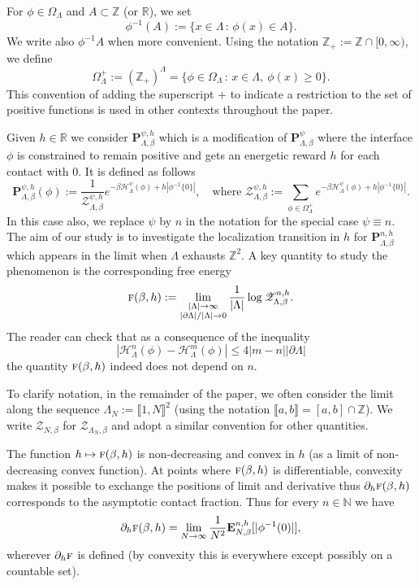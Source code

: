 \documentclass[JEP,XML,SOM,Unicode, NoFloatCountersInSection]{cedram}
\let\mathcal\mathscr
\newcommand{\sep}{\,:\,}
\numberwithin{equation}{section}
\theoremstyle{plain}
\theoremstyle{definition}
\newcommand{\lint}{\llbracket}
\newcommand{\rint}{\rrbracket}
\newcommand{\cH}{{\ensuremath{\mathcal H}} }
\newcommand{\cZ}{{\ensuremath{\mathcal Z}} }
\newcommand{\bP}{{\ensuremath{\mathbf P}} }
\newcommand{\bE}{{\ensuremath{\mathbf E}} }
\newcommand{\limtwo}[2]{\lim_{\substack{#1 \\ #2}}}
\newcommand{\bbN}{{\ensuremath{\mathbb N}} }
\newcommand{\bbR}{{\ensuremath{\mathbb R}} }
\newcommand{\bbZ}{{\ensuremath{\mathbb Z}} }
\newcommand{\gb}{\beta}
\newcommand{\gO}{\Omega}
\newcommand{\gL}{\Lambda}
\newcommand{\tf}{\textsc{f}}
\begin{document}
For $\phi \in \gO_{\gL}$ and $A\subset \bbZ$ (or $\bbR$), we set
\[
\phi^{-1}(A):=\{ x\in \gL \sep \phi(x)\in A\}.
\]
We write also $\phi^{-1}A$ when more convenient.
Using the notation $\bbZ_+:=\bbZ\cap[0,\infty)$, we define
\begin{equation}\label{positivity}
\gO^+_{\gL}:=(\bbZ_+)^{\gL}=\{\phi \in \gO_{\gL} \sep x\in \gL,\ \phi(x)\ge 0\}.
\end{equation}
This convention of adding the superscript $+$ to indicate a restriction to the set of positive functions
is used in other contexts throughout the paper.

Given $h\in \bbR$ we consider $\bP^{\psi,h}_{\gL,\gb}$ which is a modification of $\bP^{\psi}_{\gL,\gb}$
where the interface $\phi$ is constrained to remain positive
and gets an energetic reward $h$ for each contact with $0$.
It is defined as follows
\begin{equation*}%
\bP^{\psi,h}_{\gL,\gb}(\phi):= \frac{1}{\mathcal Z^{\psi,h}_{\gL,\gb}}e^{-\gb\cH^\psi_\gL(\phi)+ h|\phi^{-1}\{0\}|},
\quad \text{where } \mathcal Z^{\psi,h}_{\gL,\gb}:=\sum_{\phi\in \gO^+_{\gL}} e^{-\gb\cH^\psi_\gL(\phi)+h|\phi^{-1}\{0\}|}.
\end{equation*}
In this case also, we replace $\psi$ by $n$ in the notation for the special case $\psi\equiv n$.
The aim of our study is to investigate the localization transition in $h$ for $\bP^{n,h}_{\gL,\gb}$ which appears in the limit when $\gL$ exhausts $\bbZ^2$.
A key quantity to study the phenomenon is the corresponding free energy
\begin{equation*}%
\tf(\gb,h):=\limtwo{|\gL|\to \infty}{|\partial \gL|/|\gL|\to 0} \frac{1}{|\gL|}\log \mathcal Z^{n,h}_{\gL,\gb}.
\end{equation*}
The reader can check that as a consequence of the inequality
\[
|\cH^n_\gL(\phi)- \cH^m_\gL(\phi)|\le 4 |m-n| |\partial \gL|
\]
the quantity
$\tf(\gb,h)$ indeed does not depend on $n$.

To clarify notation, in the remainder of the paper, we often consider the limit along the sequence
$\gL_N:=\lint 1, N\rint^2$ (using the notation $\lint a,b \rint=[a,b]\cap \bbZ$).
We write $\cZ_{N,\gb}$ for $\cZ_{\gL_N,\gb}$ and adopt a similar convention for other quantities.

The function $h\mapsto \tf(\gb,h)$ is non-decreasing and convex in $h$ (as a limit of non-decreasing convex function).
At points where $\tf(\gb,h)$ is differentiable, convexity makes it possible to exchange the positions of limit and derivative
thus $\partial_h \tf(\gb,h)$ corresponds to the
asymptotic contact fraction. Thus for every $n\in \bbN$ we have
\begin{equation}\label{difencial}
\partial_h \tf(\gb,h)=\lim_{N\to \infty} \frac{1}{N^2} \bE^{n,h}_{N,\gb}[|\phi^{-1}(0)|],
\end{equation}
wherever $\partial_h\tf$ is defined (by convexity this is everywhere except possibly on a countable set).
\end{document}
